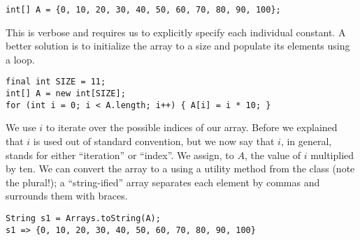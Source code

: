 \par{
\begin{verbatim}
int[] A = {0, 10, 20, 30, 40, 50, 60, 70, 80, 90, 100};
\end{verbatim}
}
This is verbose and requires us to explicitly specify each individual constant. A better solution is to initialize the array to a size and populate its elements using a loop.
\par{
\begin{verbatim}
final int SIZE = 11;
int[] A = new int[SIZE];
for (int i = 0; i < A.length; i++) { A[i] = i * 10; }
\end{verbatim}
}
We use $i$ to iterate over the possible indices of our array. Before we explained that $i$ is used out of standard convention, but we now say that $i$, in general, stands for either ``iteration'' or ``index''. We assign, to $A$, the value of $i$ multiplied by ten. We can convert the array to a  using a utility method from the  class (note the plural!); a ``string-ified'' array separates each element by commas and surrounds them with braces.
\par{
\begin{verbatim}
String s1 = Arrays.toString(A);
s1 => {0, 10, 20, 30, 40, 50, 60, 70, 80, 90, 100}
\end{verbatim}
}

